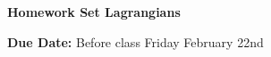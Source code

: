 


\thispagestyle{fancy}






\begin{center}
{\huge \textbf{Homework Set Lagrangians}}
\large

{\textbf{ Due Date:} Before class Friday February 22nd  } 
\end{center}


